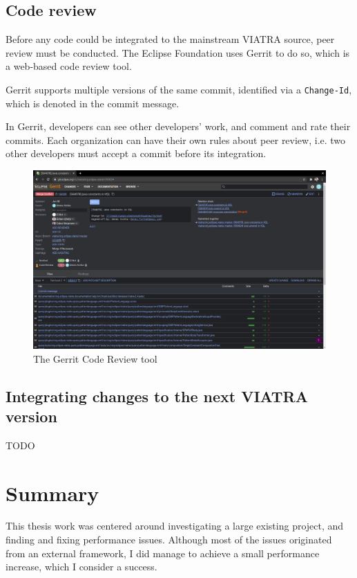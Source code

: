 \documentclass[11pt,a4paper,oneside]{report}
\begin{document}
\pagebreak

\section{Code review}
Before any code could be integrated to the mainstream VIATRA source, peer review
must be conducted. The Eclipse Foundation uses Gerrit to do so, which is a
web-based code review tool.

Gerrit supports multiple versions of the same commit, identified via a
\texttt{Change-Id}, which is denoted in the commit message.

In Gerrit, developers can see other developers' work, and comment and rate their
commits. Each organization can have their own rules about peer review, i.e. two
other developers must accept a commit before its integration.

\begin{figure}[ht]
\centering
\includegraphics[width=150mm, keepaspectratio]{figures/gerrit.png}
\caption{The Gerrit Code Review tool}
\label{fig:gerrit}
\end{figure}

\section{Integrating changes to the next VIATRA version}
TODO

\chapter{Summary}
This thesis work was centered around investigating a large existing project, and
finding and fixing performance issues. Although most of the issues originated
from an external framework, I did manage to achieve a small performance
increase, which I consider a success.
\end{document}
